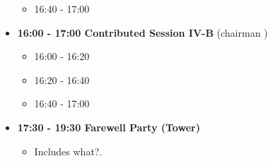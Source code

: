 \documentclass[10pt, A4]{article}
\begin{document}
\begin{itemize}
\begin{itemize}
    \item 16:40 - 17:00
  \end{itemize}
  \item {\bf 16:00 - 17:00 Contributed Session IV-B} (chairman ) 
  \begin{itemize}
    \item 16:00 - 16:20 
    \item 16:20 - 16:40 
    \item 16:40 - 17:00
  \end{itemize}  
  \item {\bf 17:30 - 19:30 Farewell Party (Tower)}
    \begin{itemize}
     \item Includes what?.  
    \end{itemize} 
\end{itemize}


\newpage
\end{document}
